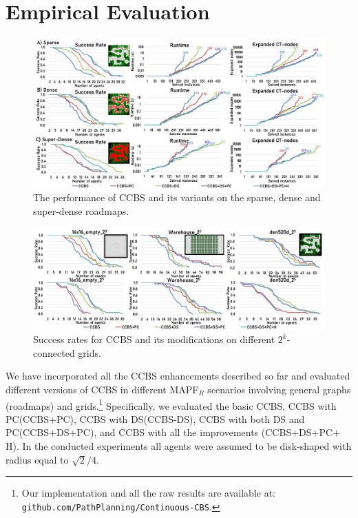 \documentclass[letterpaper]{article} %
\newcommand{\ccbs}{\ac{CCBS}\xspace}
\newcommand{\ccbsds}{\ac{CCBS-DS}\xspace}
\newcommand{\mapfr}{{MAPF}$_R$\xspace}
\newcommand{\pc}{\ac{PC}\xspace}
\newcommand{\ds}{\ac{DS}\xspace}
\begin{document}
\section{Empirical Evaluation}

\begin{figure}[t]
    \centering
    \includegraphics[width=\textwidth]{Roadmaps_results.png}
    \caption{The performance of \ccbs and its variants on the sparse, dense and super-dense roadmaps.}
    \vspace{-0.3cm}
    \label{figRoadmapsResults}
\end{figure}

\begin{figure}[t]
    \centering
    \includegraphics[width=\textwidth]{Grids_SR_all.png}
    \caption{Success rates for \ccbs and its modifications on different $2^k$-connected grids.}
    \label{figGridsResults}
\end{figure}

We have incorporated all the \ccbs enhancements described so far and evaluated different versions of \ccbs in different \mapfr scenarios involving general graphs (roadmaps) and grids.\footnote{Our implementation and all the raw results are available at: \texttt{github.com/PathPlanning/Continuous-CBS}.} 
Specifically, we evaluated the basic \ccbs, \ccbs with \pc (\ccbs+\pc), \ccbs with \ds (\ccbsds), 
\ccbs with both \ds and \pc (\ccbs+\ds+\pc), 
and \ccbs with all the improvements (\ccbs+\ds+\pc + H). 
In the conducted experiments all agents were assumed to be disk-shaped with radius equal to $\sqrt{2}/4$. 
\end{document}
